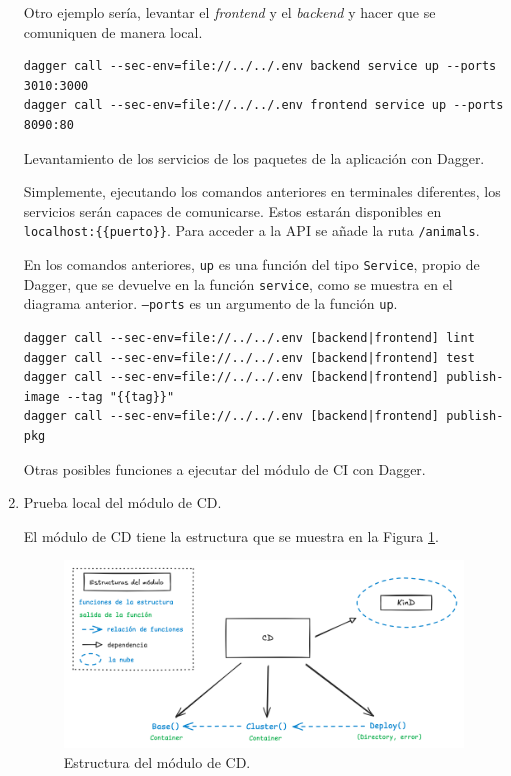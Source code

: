 \begin{enumerate}
Otro ejemplo sería, levantar el \textit{frontend} y el \textit{backend} y hacer que se comuniquen de manera local.

\begin{listing}[!ht]
  \begin{verbatim}
dagger call --sec-env=file://../../.env backend service up --ports 3010:3000
dagger call --sec-env=file://../../.env frontend service up --ports 8090:80
\end{verbatim}
\caption{Levantamiento de los servicios de los paquetes de la aplicación con Dagger.}
\end{listing}

    Simplemente, ejecutando los comandos anteriores en terminales diferentes, los servicios serán capaces de comunicarse. Estos estarán disponibles en \texttt{localhost:\{\{puerto\}\}}. Para acceder a la API se añade la ruta \texttt{/animals}.

    En los comandos anteriores, \texttt{up} es una función del tipo \texttt{Service}, propio de Dagger, que se devuelve en la función \texttt{service}, como se muestra en el diagrama anterior. \texttt{--ports} es un argumento de la función \texttt{up}.

\begin{listing}[!ht]
  \begin{verbatim}
dagger call --sec-env=file://../../.env [backend|frontend] lint
dagger call --sec-env=file://../../.env [backend|frontend] test
dagger call --sec-env=file://../../.env [backend|frontend] publish-image --tag "{{tag}}"
dagger call --sec-env=file://../../.env [backend|frontend] publish-pkg
\end{verbatim}
\caption{Otras posibles funciones a ejecutar del módulo de CI con Dagger.}
\end{listing}

  \item Prueba local del módulo de CD.

    El módulo de CD tiene la estructura que se muestra en la Figura \ref{fig:cd_schema}.

\begin{figure}
  \centerline{\includegraphics[width=13.5cm]{figuras/cd_schema}}
  \caption{Estructura del módulo de CD.}
  \label{fig:cd_schema}
\end{figure}


\end{enumerate}
